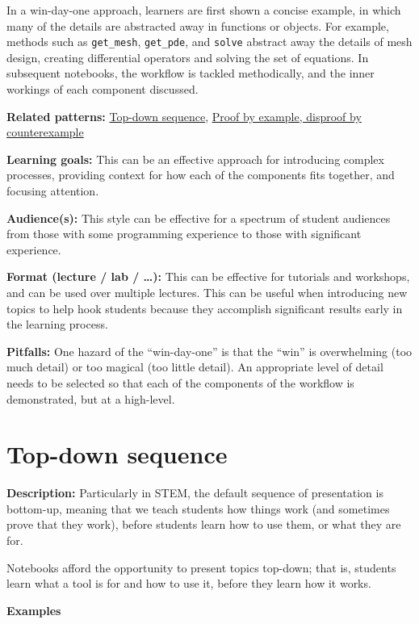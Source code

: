 \documentclass[]{book}
\begin{document}
In a win-day-one approach, learners are first shown a concise example,
in which many of the details are abstracted away in functions or
objects. For example, methods such as \texttt{get\_mesh},
\texttt{get\_pde}, and \texttt{solve} abstract away the details of mesh
design, creating differential operators and solving the set of
equations. In subsequent notebooks, the workflow is tackled
methodically, and the inner workings of each component discussed.

\textbf{Related patterns:}
\protect\hyperlink{top-down-sequence}{Top-down sequence},
\protect\hyperlink{proof-by-example-disproof-by-counterexample}{Proof by
example, disproof by counterexample}

\textbf{Learning goals:} This can be an effective approach for
introducing complex processes, providing context for how each of the
components fits together, and focusing attention.

\textbf{Audience(s):} This style can be effective for a spectrum of
student audiences from those with some programming experience to those
with significant experience.

\textbf{Format (lecture / lab / \ldots{}):} This can be effective for
tutorials and workshops, and can be used over multiple lectures. This
can be useful when introducing new topics to help hook students because
they accomplish significant results early in the learning process.

\textbf{Pitfalls:} One hazard of the ``win-day-one'' is that the ``win''
is overwhelming (too much detail) or too magical (too little detail). An
appropriate level of detail needs to be selected so that each of the
components of the workflow is demonstrated, but at a high-level.

\hypertarget{top-down-sequence}{\section{Top-down
sequence}\label{top-down-sequence}}

\textbf{Description:} Particularly in STEM, the default sequence of
presentation is bottom-up, meaning that we teach students how things
work (and sometimes prove that they work), before students learn how to
use them, or what they are for.

Notebooks afford the opportunity to present topics top-down; that is,
students learn what a tool is for and how to use it, before they learn
how it works.

\textbf{Examples}
\end{document}
